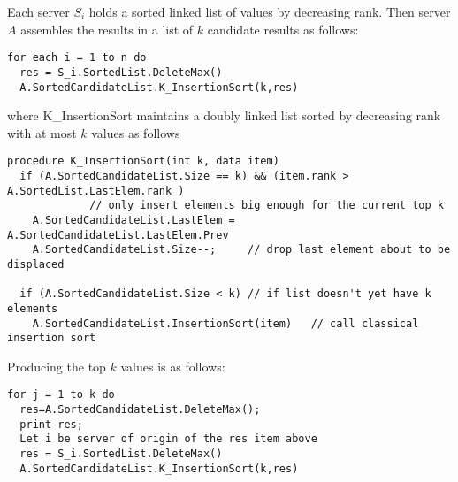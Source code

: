 \documentclass[12pt]{article}
\begin{document}
Each server $S_i$ holds a sorted linked list of values by
decreasing rank. Then server $A$ assembles the results in a list
of $k$ candidate results as follows:
\begin{verbatim}
for each i = 1 to n do
  res = S_i.SortedList.DeleteMax()
  A.SortedCandidateList.K_InsertionSort(k,res)
\end{verbatim}
where K\_InsertionSort maintains a doubly linked list sorted by decreasing rank with at most
$k$ values as follows
\begin{verbatim}
procedure K_InsertionSort(int k, data item)
  if (A.SortedCandidateList.Size == k) && (item.rank > A.SortedList.LastElem.rank )
             // only insert elements big enough for the current top k
    A.SortedCandidateList.LastElem = A.SortedCandidateList.LastElem.Prev
    A.SortedCandidateList.Size--;     // drop last element about to be displaced

  if (A.SortedCandidateList.Size < k) // if list doesn't yet have k elements
    A.SortedCandidateList.InsertionSort(item)   // call classical insertion sort
\end{verbatim}
Producing the top $k$ values is as follows:
\begin{verbatim}
for j = 1 to k do
  res=A.SortedCandidateList.DeleteMax();
  print res;
  Let i be server of origin of the res item above
  res = S_i.SortedList.DeleteMax()
  A.SortedCandidateList.K_InsertionSort(k,res)
\end{verbatim}
\end{document}
